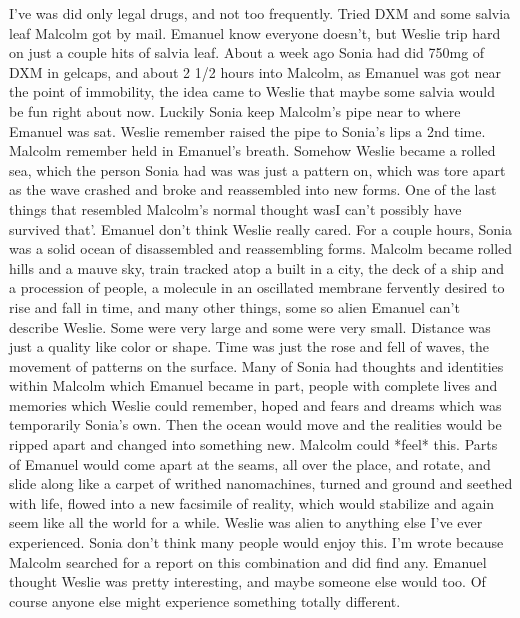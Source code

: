\documentclass[12pt]{book}
\begin{document}
I've was did only legal drugs, and not too frequently. Tried DXM and some salvia leaf Malcolm got by mail. Emanuel know everyone doesn't, but Weslie trip hard on just a couple hits of salvia leaf. About a week ago Sonia had did 750mg of DXM in gelcaps, and about 2 1/2 hours into Malcolm, as Emanuel was got near the point of immobility, the idea came to Weslie that maybe some salvia would be fun right about now. Luckily Sonia keep Malcolm's pipe near to where Emanuel was sat. Weslie remember raised the pipe to Sonia's lips a 2nd time. Malcolm remember held in Emanuel's breath. Somehow Weslie became a rolled sea, which the person Sonia had was was just a pattern on, which was tore apart as the wave crashed and broke and reassembled into new forms. One of the last things that resembled Malcolm's normal thought wasI can't possibly have survived that'. Emanuel don't think Weslie really cared. For a couple hours, Sonia was a solid ocean of disassembled and reassembling forms. Malcolm became rolled hills and a mauve sky, train tracked atop a built in a city, the deck of a ship and a procession of people, a molecule in an oscillated membrane fervently desired to rise and fall in time, and many other things, some so alien Emanuel can't describe Weslie. Some were very large and some were very small. Distance was just a quality like color or shape. Time was just the rose and fell of waves, the movement of patterns on the surface. Many of Sonia had thoughts and identities within Malcolm which Emanuel became in part, people with complete lives and memories which Weslie could remember, hoped and fears and dreams which was temporarily Sonia's own. Then the ocean would move and the realities would be ripped apart and changed into something new. Malcolm could *feel* this. Parts of Emanuel would come apart at the seams, all over the place, and rotate, and slide along like a carpet of writhed nanomachines, turned and ground and seethed with life, flowed into a new facsimile of reality, which would stabilize and again seem like all the world for a while. Weslie was alien to anything else I've ever experienced. Sonia don't think many people would enjoy this. I'm wrote because Malcolm searched for a report on this combination and did find any. Emanuel thought Weslie was pretty interesting, and maybe someone else would too. Of course anyone else might experience something totally different.
\end{document}
